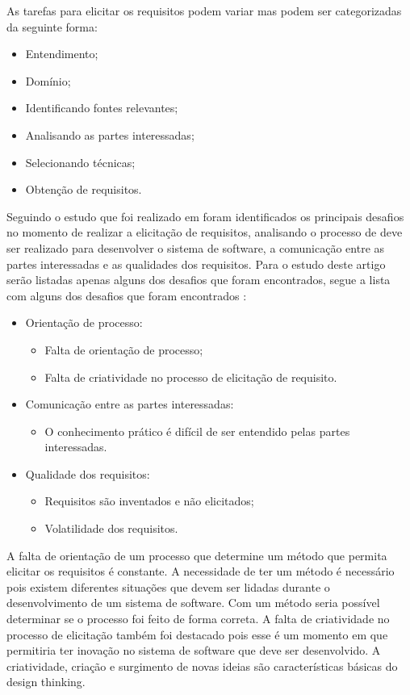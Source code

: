 \documentclass[a4paper,twoside]{article}
\begin{document}
As tarefas para elicitar os requisitos podem variar mas podem ser categorizadas da seguinte forma:
\begin{itemize}
    \item Entendimento;
    \item Domínio;
    \item Identificando fontes relevantes;
    \item Analisando as partes interessadas;
    \item Selecionando técnicas;
    \item Obtenção de requisitos.
\end{itemize}

Seguindo o estudo que foi realizado em \cite{DBLP:conf/sac/PereiraPPMC21} foram identificados os principais desafios no momento de realizar a elicitação de requisitos, analisando o processo de deve ser realizado para desenvolver o sistema de software,  a comunicação entre as partes interessadas e as qualidades dos requisitos. Para o estudo deste artigo serão listadas apenas alguns dos desafios que foram encontrados, segue a lista com alguns dos desafios que foram encontrados \cite{DBLP:conf/sac/PereiraPPMC21}:

\begin{itemize}
    \item Orientação de processo:
    \begin{itemize}
        \item Falta de orientação de processo;
        \item Falta de criatividade no processo de elicitação de requisito.
    \end{itemize}
    \item Comunicação entre as partes interessadas:
    \begin{itemize}
        \item O conhecimento prático é difícil de ser entendido pelas partes interessadas.
    \end{itemize}
    \item Qualidade dos requisitos:
    \begin{itemize}
        \item Requisitos são inventados e não elicitados;
        \item Volatilidade dos requisitos.
    \end{itemize}
\end{itemize}

A falta de orientação de um processo que determine um método que permita elicitar os requisitos é constante. A necessidade de ter um método é necessário pois existem diferentes situações que devem ser lidadas durante o desenvolvimento de um sistema de software. Com um método seria possível determinar se o processo foi feito de forma correta. A falta de criatividade no processo de elicitação também foi destacado pois esse é um momento em que permitiria ter inovação no sistema de software que deve ser desenvolvido. A criatividade, criação e surgimento de novas ideias são características básicas do design thinking\cite{DBLP:conf/sac/PereiraPPMC21}\cite{Definicao}.
\end{document}
